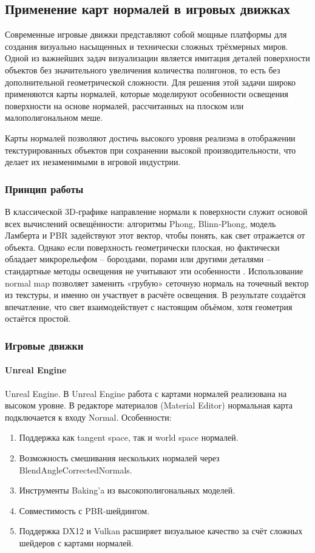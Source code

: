 \subsection{Применение карт нормалей в игровых движках}

Современные игровые движки представляют собой мощные платформы для создания визуально насыщенных и технически сложных трёхмерных миров. Одной из важнейших задач визуализации является имитация деталей поверхности объектов без значительного увеличения количества полигонов, то есть без дополнительной геометрической сложности. Для решения этой задачи широко применяются карты нормалей, которые моделируют особенности освещения поверхности на основе нормалей, рассчитанных на плоском или малополигональном меше.

Карты нормалей позволяют достичь высокого уровня реализма в отображении текстурированных объектов при сохранении высокой производительности, что делает их незаменимыми в игровой индустрии. 
\subsubsection{Принцип работы}

В классической 3D‑графике направление нормали к поверхности служит основой всех вычислений освещённости: алгоритмы Phong, Blinn‑Phong, модель Ламберта и PBR задействуют этот вектор, чтобы понять, как свет отражается от объекта. Однако если поверхность геометрически плоская, но фактически обладает микрорельефом -- бороздами, порами или другими деталями -- стандартные методы освещения не учитывают эти особенности \cite{bruno2024}. Использование normal map позволяет заменить «грубую» сеточную нормаль на точечный вектор из текстуры, и именно он участвует в расчёте освещения. В результате создаётся впечатление, что свет взаимодействует с настоящим объёмом, хотя геометрия остаётся простой.
\subsubsection{Игровые движки}
\paragraph{Unreal Engine}

Unreal Engine. В Unreal Engine работа с картами нормалей реализована на высоком уровне. В редакторе материалов (Material Editor) нормальная карта подключается к входу Normal. Особенности:
\begin{enumerate}
	\item Поддержка как tangent space, так и world space нормалей.
	\item Возможность смешивания нескольких нормалей через BlendAngleCorrectedNormals.
	\item Инструменты Baking'a из высокополигональных моделей.
	\item Совместимость с PBR-шейдингом.
	\item Поддержка DX12 и Vulkan расширяет визуальное качество за счёт сложных шейдеров с картами нормалей.
\end{enumerate}

